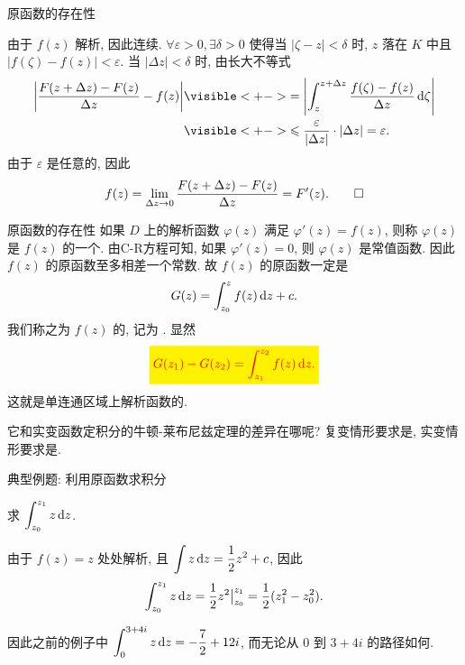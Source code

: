\begin{frame}{原函数的存在性}
\begin{proofe}
由于 $f(z)$ 解析, 因此连续.
\onslide<+->
$\forall\varepsilon>0,\exists\delta>0$ 使得当 $|\zeta-z|<\delta$ 时, $z$ 落在 $K$ 中且 $|f(\zeta)-f(z)|<\varepsilon$.
\onslide<+->
当 $|\Delta z|<\delta$ 时, 由长大不等式
\begin{align*}
\abs{\frac{F(z+\Delta z)-F(z)}{\Delta z}-f(z)}
&\visible<+->{=\abs{\int_z^{z+\Delta z}\frac{f(\zeta)-f(z)}{\Delta z}\diff \zeta}}\\
&\visible<+->{\le\frac{\varepsilon}{|\Delta z|}\cdot|\Delta z|=\varepsilon.}
\end{align*}
\onslide<+->
由于 $\varepsilon$ 是任意的, 因此
\[f(z)=\lim_{\Delta z\to 0}\frac{F(z+\Delta z)-F(z)}{\Delta z}=F'(z).\qedhere\]
\end{proofe}
\end{frame}


\begin{frame}{原函数的存在性}
\onslide<+->
如果 $D$ 上的解析函数 $\varphi(z)$ 满足 $\varphi'(z)=f(z)$, 则称 $\varphi(z)$ 是 $f(z)$ 的一个.
\onslide<+->
由C-R方程可知, 如果 $\varphi'(z)=0$, 则 $\varphi(z)$ 是常值函数.
\onslide<+->
因此 $f(z)$ 的原函数至多相差一个常数.
\onslide<+->
故 $f(z)$ 的原函数一定是
\[G(z)=\int_{z_0}^zf(z)\,\mathrm{d} z+c.\]
\onslide<+->
我们称之为 $f(z)$ 的, 记为 .
\onslide<+->
显然
\[\eqatt{G(z_1)-G(z_2)=\int_{z_1}^{z_2}f(z)\diff z.}\]
\onslide<+->
这就是单连通区域上解析函数的.

\onslide<+->
它和实变函数定积分的牛顿-莱布尼兹定理的差异在哪呢?
\onslide<+->
复变情形要求是, 实变情形要求是.
\end{frame}


\begin{frame}{典型例题: 利用原函数求积分}
\begin{example}\vspace{4pt}
求 $\displaystyle\int_{z_0}^{z_1}z\,\mathrm{d} z$.
\end{example}
\begin{solution}
由于 $f(z)=z$ 处处解析,
\onslide<+->
且 $\displaystyle\int z\,\mathrm{d} z=\frac12 z^2+c$,
\onslide<+->
因此
\[\int_{z_0}^{z_1}z\,\mathrm{d} z=\frac12z^2\big|_{z_0}^{z_1}=\frac12(z_1^2-z_0^2).\]
\end{solution}
\onslide<+->
因此之前的例子中 $\displaystyle\int_0^{3+4i}z\,\mathrm{d} z=-\frac72+12i$, 而无论从 $0$ 到 $3+4i$ 的路径如何.
\end{frame}


